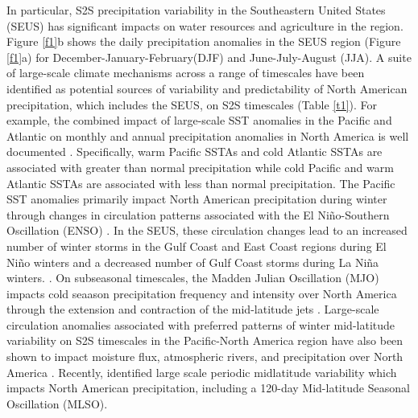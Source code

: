\documentclass{ametsocV6.1}
\begin{document}
In particular, S2S precipitation variability in the Southeastern United States (SEUS) has significant impacts on water resources and agriculture in the region. Figure \ref{f1}b shows the daily precipitation anomalies in the SEUS region (Figure \ref{f1}a) for December-January-February(DJF) and June-July-August (JJA).  A suite of large-scale climate mechanisms across a range of timescales have been identified as potential sources of variability and predictability of North American precipitation, which includes the SEUS, on S2S timescales (Table \ref{t1}). For example, the combined impact of large-scale SST anomalies in the Pacific and Atlantic on monthly and annual precipitation anomalies in North America is well documented \citep[e.g.,][]{schubert_us_2009}. Specifically, warm Pacific SSTAs and cold Atlantic SSTAs are associated with greater than normal precipitation while cold Pacific and warm Atlantic SSTAs are associated with less than normal precipitation. The Pacific SST anomalies primarily impact North American precipitation during winter through changes in circulation patterns associated with the El Ni\~no-Southern Oscillation (ENSO) \citep{ropelewski_north_1986}.  In the SEUS, these circulation changes lead to an increased number of winter storms in the Gulf Coast and East Coast regions during El Ni\~no winters and a decreased number of Gulf Coast storms during La Ni\~na winters. \citep{schubert_us_2009}.  On subseasonal timescales, the Madden Julian Oscillation (MJO) impacts cold seaason precipitation frequency and intensity over North America through the extension and contraction of the mid-latitude jets \citep{stan_review_2017,becker_modulation_2011,zhou_composite_2011}. Large-scale circulation anomalies associated with preferred patterns of winter mid-latitude variability on S2S timescales in the Pacific-North America region have also been shown to impact moisture flux, atmospheric rivers, and precipitation over North America \citep{amini_control_2019,robertson_toward_2020,cassou_intraseasonal_2008}.  Recently, \citet{stan_intra-seasonal_2019} identified large scale periodic midlatitude variability which impacts North American precipitation, including a 120-day Mid-latitude Seasonal Oscillation (MLSO). 
\end{document}
